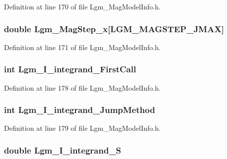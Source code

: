 Definition at line 170 of file Lgm\_\-MagModelInfo.h.\hypertarget{struct_lgm___mag_model_info_d2c62978bb8693b682121af1a5e57779}{
\subsubsection[{Lgm\_\-MagStep\_\-x}]{\setlength{\rightskip}{0pt plus 5cm}double {\bf Lgm\_\-MagStep\_\-x}\mbox{[}LGM\_\-MAGSTEP\_\-JMAX\mbox{]}}}
\label{struct_lgm___mag_model_info_d2c62978bb8693b682121af1a5e57779}




Definition at line 171 of file Lgm\_\-MagModelInfo.h.\hypertarget{struct_lgm___mag_model_info_702cb79ba0ac9c88d1038676a4db833f}{
\subsubsection[{Lgm\_\-I\_\-integrand\_\-FirstCall}]{\setlength{\rightskip}{0pt plus 5cm}int {\bf Lgm\_\-I\_\-integrand\_\-FirstCall}}}
\label{struct_lgm___mag_model_info_702cb79ba0ac9c88d1038676a4db833f}




Definition at line 178 of file Lgm\_\-MagModelInfo.h.\hypertarget{struct_lgm___mag_model_info_c3c19bdf192ad5db270e70441bfa3392}{
\subsubsection[{Lgm\_\-I\_\-integrand\_\-JumpMethod}]{\setlength{\rightskip}{0pt plus 5cm}int {\bf Lgm\_\-I\_\-integrand\_\-JumpMethod}}}
\label{struct_lgm___mag_model_info_c3c19bdf192ad5db270e70441bfa3392}




Definition at line 179 of file Lgm\_\-MagModelInfo.h.\hypertarget{struct_lgm___mag_model_info_bd9305e3ff7eac184a3f651ae47ae5bc}{
\subsubsection[{Lgm\_\-I\_\-integrand\_\-S}]{\setlength{\rightskip}{0pt plus 5cm}double {\bf Lgm\_\-I\_\-integrand\_\-S}}}
\label{struct_lgm___mag_model_info_bd9305e3ff7eac184a3f651ae47ae5bc}




